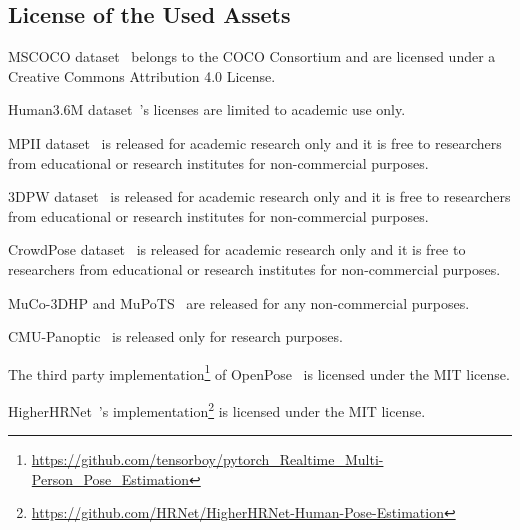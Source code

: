 \documentclass[10pt,twocolumn,letterpaper]{article}
\begin{document}
\subsection*{License of the Used Assets}
\begin{compactitem}[]
    \item MSCOCO dataset~\cite{lin2014mscoco} belongs to the COCO Consortium and are licensed under a Creative Commons Attribution 4.0 License.
    \item Human3.6M dataset~\cite{ionescu2014human3}'s licenses are limited to academic use only. 
    \item MPII dataset~\cite{andriluka2014mpii} is released for academic research only and it is free to researchers from educational or research institutes for non-commercial purposes.
    \item 3DPW dataset~\cite{von20183dpw} is released for academic research only and it is free to researchers from educational or research institutes for non-commercial purposes.
    \item CrowdPose dataset~\cite{li2019crowdpose} is released for academic research only and it is free to researchers from educational or research institutes for non-commercial purposes.
    \item MuCo-3DHP and MuPoTS~\cite{mehta2018single} are released for any non-commercial purposes.
    \item CMU-Panoptic~\cite{joo2017panoptic} is released only for research purposes.
    \item The third party implementation\footnote{\url{https://github.com/tensorboy/pytorch\_Realtime\_Multi-Person\_Pose\_Estimation}} of OpenPose~\cite{cao2017realtime} is licensed under the MIT license.
    \item HigherHRNet~\cite{cheng2020higherhrnet}'s implementation\footnote{\url{https://github.com/HRNet/HigherHRNet-Human-Pose-Estimation}} is licensed under the MIT license.
\end{compactitem}
\end{document}
